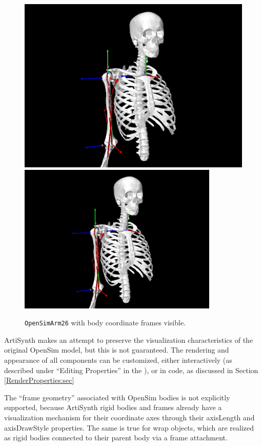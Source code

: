 \begin{figure}[ht]
\begin{center}
   \iflatexml 
      \includegraphics[]{images/Arm26BodyFrames} 
   \else 
      \includegraphics[width=3.75in]{images/Arm26BodyFrames} \fi
\end{center}
\caption{{\tt OpenSimArm26} with body coordinate frames visible.}
\label{Arm26BodyFrames:fig}
\end{figure}

ArtiSynth makes an attempt to preserve the visualization characteristics of the
original OpenSim model, but this is not guaranteed. The rendering and appearance
of all components can be customized, either interactively (as described under
``Editing Properties'' in the ), or in code, as discussed in Section \ref{RenderProperties:sec}

The ``frame geometry'' associated with OpenSim bodies is not explicitly
supported, because ArtiSynth rigid bodies and frames already have a
visualization mechanism for their coordinate axes through their {\sf
axisLength} and {\sf axisDrawStyle} properties. The same is true for wrap
objects, which are realized as rigid bodies connected to their parent body via
a frame attachment.

